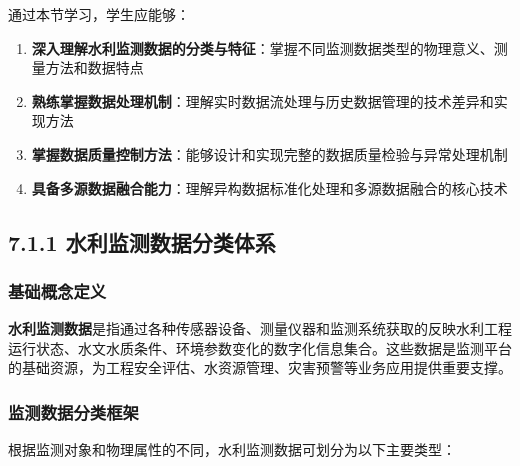 通过本节学习，学生应能够：

\begin{enumerate}
\def\labelenumi{\arabic{enumi}.}
\tightlist
\item
  \textbf{深入理解水利监测数据的分类与特征}：掌握不同监测数据类型的物理意义、测量方法和数据特点
\item
  \textbf{熟练掌握数据处理机制}：理解实时数据流处理与历史数据管理的技术差异和实现方法
\item
  \textbf{掌握数据质量控制方法}：能够设计和实现完整的数据质量检验与异常处理机制
\item
  \textbf{具备多源数据融合能力}：理解异构数据标准化处理和多源数据融合的核心技术
\end{enumerate}

\subsection{7.1.1 水利监测数据分类体系}\label{ux6c34ux5229ux76d1ux6d4bux6570ux636eux5206ux7c7bux4f53ux7cfb}

\subsubsection{基础概念定义}\label{ux57faux7840ux6982ux5ff5ux5b9aux4e49}

\textbf{水利监测数据}是指通过各种传感器设备、测量仪器和监测系统获取的反映水利工程运行状态、水文水质条件、环境参数变化的数字化信息集合。这些数据是监测平台的基础资源，为工程安全评估、水资源管理、灾害预警等业务应用提供重要支撑。

\subsubsection{监测数据分类框架}\label{ux76d1ux6d4bux6570ux636eux5206ux7c7bux6846ux67b6}

根据监测对象和物理属性的不同，水利监测数据可划分为以下主要类型：

